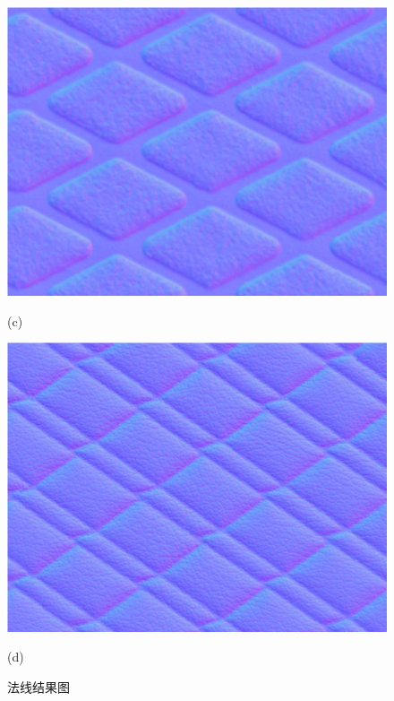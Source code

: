 \begin{figure}[htbp]
\begin{minipage}{0.48\linewidth}
\centerline{\includegraphics[width=1.0\linewidth]{figures/faxianjieguotuc.png}}
\centerline{(c)}
\end{minipage}
\begin{minipage}{0.48\linewidth}
\centerline{\includegraphics[width=1.0\linewidth]{figures/faxianjieguotud.png}}
\centerline{(d)}
\end{minipage}

\caption{法线结果图}
\label{fig:faxianjieguotu2}
\end{figure}